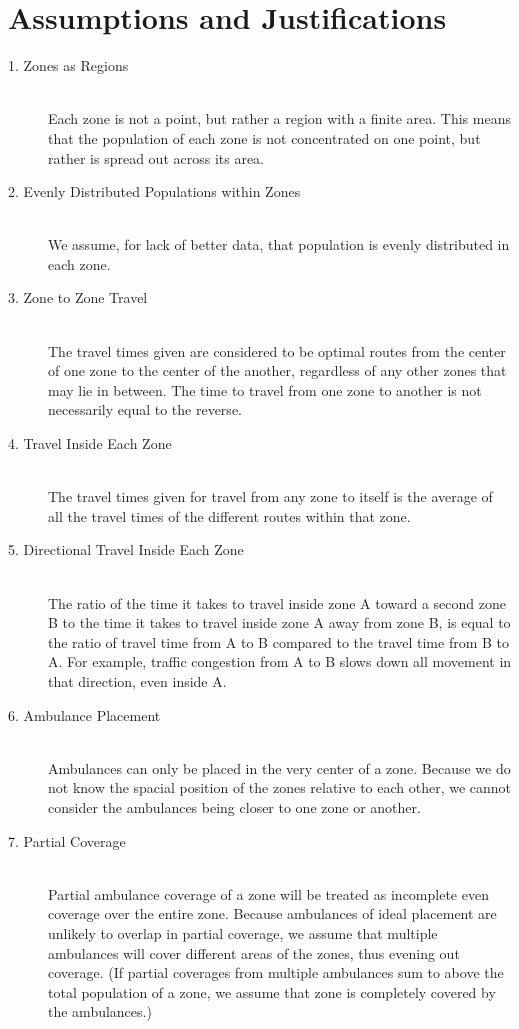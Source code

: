 \documentclass[notitlepage, 12pt]{article}
\begin{document}
\section{Assumptions and Justifications}
\begin{description}
    \item[1. Zones as Regions] \hfill \\
    	Each zone is not a point, but rather a region with a finite area. This means that the population of each zone is not concentrated on one point, but rather is spread out across its area.
    \item[2. Evenly Distributed Populations within Zones]\hfill \\
    	We assume, for lack of better data, that population is evenly distributed in each zone.
    \item[3. Zone to Zone Travel] \hfill \\
    	The travel times given are considered to be optimal routes from the center of one zone to
        the center of the another, regardless of any other zones that may lie in between. The time to travel from one zone to another is not necessarily equal to the reverse.
    \item[4. Travel Inside Each Zone] \hfill \\
    	The travel times given for travel from any zone to itself is the average
        of all the travel times of the different routes within that zone.
    \item[5. Directional Travel Inside Each Zone] \hfill \\
    	The ratio of the time it takes to travel inside zone A toward a second zone B
        to the time it takes to travel inside zone A away from zone B, is equal to the ratio
        of travel time from A to B compared to the travel time from B to A. For example, traffic congestion from A to B  slows down all movement in that direction, even inside A.
    \item[6. Ambulance Placement] \hfill \\
        Ambulances can only be placed in the very center of a zone. Because we do not know the
        spacial position of the zones relative to each other, we cannot consider the ambulances
        being closer to one zone or another.
    \item[7. Partial Coverage] \hfill \\
        Partial ambulance coverage of a zone will be treated as incomplete even coverage over the entire
        zone. Because ambulances of ideal placement are unlikely to overlap in partial coverage, we assume
        that multiple ambulances will cover different areas of the zones, thus evening out coverage.
        (If partial coverages from multiple ambulances sum to above the total population of a zone,
        we assume that zone is completely covered by the ambulances.)
\end{description}
\end{document}
